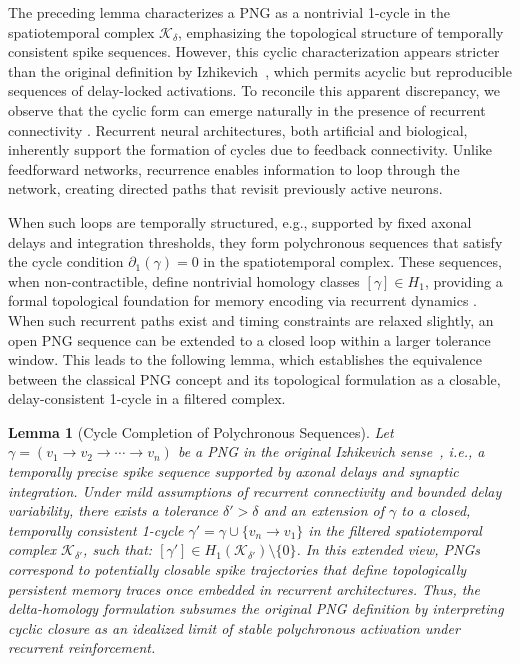 \documentclass[lettersize,journal]{IEEEtran}
\newtheorem{lemma}{Lemma}
\begin{document}
The preceding lemma characterizes a PNG as a nontrivial 1-cycle in the spatiotemporal complex \( \mathcal{K}_\delta \), emphasizing the topological structure of temporally consistent spike sequences. However, this cyclic characterization appears stricter than the original definition by Izhikevich~\cite{izhikevich2006polychronization}, which permits acyclic but reproducible sequences of delay-locked activations. To reconcile this apparent discrepancy, we observe that the cyclic form can emerge naturally in the presence of recurrent connectivity \cite{schuster1997bidirectional}. 
Recurrent neural architectures, both artificial and biological, inherently support the formation of cycles due to feedback connectivity. Unlike feedforward networks, recurrence enables information to loop through the network, creating directed paths that revisit previously active neurons. 

When such loops are temporally structured, e.g., supported by fixed axonal delays and integration thresholds, they form polychronous sequences that satisfy the cycle condition \( \partial_1(\gamma) = 0 \) in the spatiotemporal complex. These sequences, when non-contractible, define nontrivial homology classes \( [\gamma] \in H_1 \), providing a formal topological foundation for memory encoding via recurrent dynamics \cite{yu2019review}.
When such recurrent paths exist and timing constraints are relaxed slightly, an open PNG sequence can be extended to a closed loop within a larger tolerance window. This leads to the following lemma, which establishes the equivalence between the classical PNG concept \cite{izhikevich2006polychronization} and its topological formulation as a closable, delay-consistent 1-cycle in a filtered complex.

\begin{lemma}[Cycle Completion of Polychronous Sequences]
Let \( \gamma = (v_1 \to v_2 \to \cdots \to v_n) \) be a PNG in the original Izhikevich sense~\cite{izhikevich2006polychronization}, i.e., a temporally precise spike sequence supported by axonal delays and synaptic integration. Under mild assumptions of recurrent connectivity and bounded delay variability, there exists a tolerance \( \delta' > \delta \) and an extension of \( \gamma \) to a closed, temporally consistent 1-cycle \( \gamma' = \gamma \cup \{v_n \to v_1\} \) in the filtered spatiotemporal complex \( \mathcal{K}_{\delta'} \), such that:
$[\gamma'] \in H_1(\mathcal{K}_{\delta'}) \setminus \{0\}$.
In this extended view, PNGs correspond to potentially closable spike trajectories that define topologically persistent memory traces once embedded in recurrent architectures. Thus, the delta-homology formulation subsumes the original PNG definition by interpreting cyclic closure as an idealized limit of stable polychronous activation under recurrent reinforcement.
\label{lemma:equiv}
\end{lemma}
\end{document}
